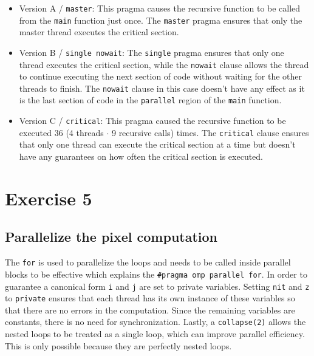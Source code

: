 \documentclass[a4paper,%
7pt,%
DIV12,
headsepline,%
headings=normal,
]{scrartcl}
\begin{document}
\begin{itemize}

    \item Version A / \texttt{master}: This pragma causes the recursive function to be called from the \texttt{main} function just once. The \texttt{master} pragma ensures that only the master thread executes the critical section.

    \item Version B / \texttt{single nowait}: The \texttt{single} pragma ensures that only one thread executes the critical section, while the \texttt{nowait} clause allows the thread to continue executing the next section of code without waiting for the other threads to finish. The \texttt{nowait} clause in this case doesn't have any effect as it is the last section of code in the \texttt{parallel} region of the \texttt{main} function.
    
    \item Version C / \texttt{critical}: This pragma caused the recursive function to be executed 36 (4 threads $\cdot$ 9 recursive calls) times. The \texttt{critical} clause ensures that only one thread can execute the critical section at a time but doesn't have any guarantees on how often the critical section is executed.

\end{itemize}

\section{Exercise 5}

\subsection{Parallelize the pixel computation}

The \texttt{for} is used to parallelize the loops and needs to be called inside parallel blocks to be effective which explains the \texttt{\#pragma omp parallel for}. In order to guarantee a canonical form \texttt{i} and \texttt{j} are set to private variables. Setting \texttt{nit} and \texttt{z} to \texttt{private} ensures that each thread has its own instance of these variables so that there are no errors in the computation. Since the remaining variables are constants, there is no need for synchronization. Lastly, a \texttt{collapse(2)} allows the nested loops to be treated as a single loop, which can improve parallel efficiency. This is only possible because they are perfectly nested loops. 
\end{document}
